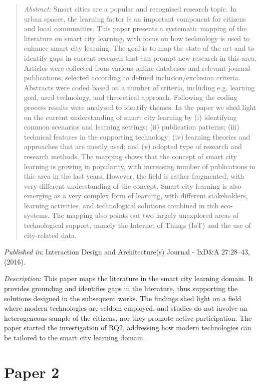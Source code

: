 \begin{quote}
	\emph{Abstract:} Smart cities are a popular and recognised research topic. In urban spaces, the learning factor is an important component for citizens and local communities. This paper presents a systematic mapping of the literature on smart city learning, with focus on how technology is used to enhance smart city learning. The goal is to map the state of the art and to identify gaps in current research that can prompt new research in this area. Articles were collected from various online databases and relevant journal publications, selected according to defined inclusion/exclusion criteria. Abstracts were coded based on a number of criteria, including e.g. learning goal, used technology, and theoretical approach. Following the coding process results were analysed to identify themes. In the paper we shed light on the current understanding of smart city learning by (i) identifying common scenarios and learning settings; (ii) publication patterns; (iii) technical features in the supporting technology; (iv) learning theories and approaches that are mostly used; and (v) adopted type of research and research methods. The mapping shows that the concept of smart city learning is growing in popularity, with increasing number of publications in this area in the last years. However, the field is rather fragmented, with very different understanding of the concept.  Smart city learning is also emerging as a very complex form of learning, with different stakeholders, learning activities, and technological solutions combined in rich eco-systems. The mapping also points out two largely unexplored areas of technological support, namely the Internet of Things (IoT) and the use of city-related data.
\end{quote}

\emph{Published in}: Interaction Design and Architecture(s) Journal - IxD\&A 27:28--43, (2016).

\emph{Description}: This paper maps the literature in the smart city learning domain. It provides grounding and identifies gaps in the literature, thus supporting the solutions designed in the subsequent works. The findings shed light on a field where modern technologies are seldom employed, and studies do not involve an heterogeneous sample of the citizens, nor they promote active participation.
The paper started the investigation of RQ2, addressing how modern technologies can be tailored to the smart city learning domain.


\section[P2: Tiles: A Card-Based Ideation Toolkit for the Internet of Things.][Paper 2]{Paper 2}
\label{paper-2}

